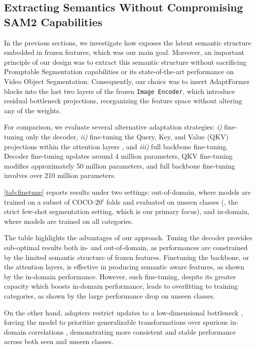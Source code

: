 \subsection{Extracting Semantics Without Compromising SAM2 Capabilities}

In the previous sections, we investigate how \ours{} exposes the latent semantic structure embedded in frozen \sam{} features, which was our main goal. Moreover, an important principle of our design was to extract this semantic structure without sacrificing \sam{} Promptable Segmentation capabilities or its state-of-the-art performance on Video Object Segmentation. Consequently, our choice was to insert AdaptFormer blocks \cite{chen2022adaptformer} into the last two layers of the frozen \texttt{Image Encoder}, which introduce residual bottleneck projections, reorganizing the feature space without altering any of the \sam{} weights.

For comparison, we evaluate several alternative adaptation strategies: \textit{i)} fine-tuning only the decoder, \textit{ii)} fine-tuning the Query, Key, and Value (QKV) projections within the attention layers \cite{touvron2022three}, and \textit{iii)} full backbone fine-tuning. Decoder fine-tuning updates around 4 million parameters, QKV fine-tuning modifies approximately 50 million parameters, and full backbone fine-tuning involves over 210 million parameters.

\cref{tab:finetune} reports results under two settings: out-of-domain, where models are trained on a subset of COCO-20$^i$ folds and evaluated on unseen classes (\ie, the strict few-shot segmentation setting, which is our primary focus), and in-domain, where models are trained on all categories.



The table highlights the advantages of our approach. Tuning the decoder provides sub-optimal results both in- and out-of-domain, as performances are constrained by the limited semantic structure of frozen features. Finetuning the backbone, or the attention layers, is effective in producing semantic aware features, as shown by the in-domain performance. 
However, such fine-tuning, despite its greater capacity which boosts in-domain performance, leads to overfitting to training categories, as shown by the large performance drop on unseen classes.

On the other hand, adapters restrict updates to a low-dimensional bottleneck \cite{hu2022lora, houlsby2019adapter}, forcing the model to prioritize generalizable transformations over spurious in-domain correlations \cite{he2021effectiveness}, demonstrating more consistent and stable performance across both seen and unseen classes.


